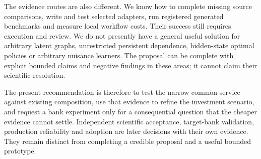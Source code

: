The evidence routes are also different. We know how to complete missing
source comparisons, write and test selected adapters, run registered
generated benchmarks and measure local workflow costs. Their success
still requires execution and review. We do not presently have a general
useful solution for arbitrary latent graphs, unrestricted persistent
dependence, hidden-state optimal policies or arbitrary nuisance
learners. The proposal can be complete with explicit bounded claims and
negative findings in these areas; it cannot claim their scientific
resolution. \citep{sp20md_reader,
sp13_persistence,sp13_servicing_successor}

The present recommendation is therefore to test the narrow common
service against existing composition, use that evidence to refine the
investment scenario, and request a bank experiment only for a
consequential question that the cheaper evidence cannot settle.
Independent scientific acceptance, target-bank validation, production
reliability and adoption are later decisions with their own evidence.
They remain distinct from completing a credible proposal and a useful
bounded prototype.
